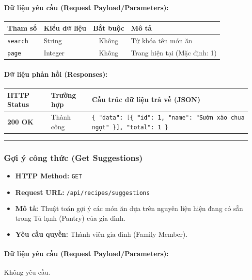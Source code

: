 \documentclass[12pt,a4paper]{article}
\begin{document}
\paragraph{Dữ liệu yêu cầu (Request Payload/Parameters):}
\begin{longtable}{|p{2.8cm}|p{2.2cm}|c|p{7.0cm}|}
\hline
\textbf{Tham số} & \textbf{Kiểu dữ liệu} & \textbf{Bắt buộc} & \textbf{Mô tả} \\ \hline
\endhead
\texttt{search} & String & Không & Từ khóa tên món ăn \\ \hline
\texttt{page} & Integer & Không & Trang hiện tại (Mặc định: 1) \\ \hline
\end{longtable}

\paragraph{Dữ liệu phản hồi (Responses):}
\begin{longtable}{|p{2.8cm}|p{3.2cm}|p{8.0cm}|}
\hline
\textbf{HTTP Status} & \textbf{Trường hợp} & \textbf{Cấu trúc dữ liệu trả về (JSON)} \\ \hline
\endhead
\textbf{200 OK} & Thành công & \texttt{\{ "data": [\{ "id": 1, "name": "Sườn xào chua ngọt" \}], "total": 1 \}} \\ \hline
\end{longtable}

\vskip 0.4cm
\noindent\rule{\textwidth}{0.3pt}
\vskip 0.4cm

\subsubsection{Gợi ý công thức (Get Suggestions)}
\begin{itemize}[leftmargin=*]
    \item \textbf{HTTP Method:} \texttt{GET}
    \item \textbf{Request URL:} \texttt{/api/recipes/suggestions}
    \item \textbf{Mô tả:} Thuật toán gợi ý các món ăn dựa trên nguyên liệu hiện đang có sẵn trong Tủ lạnh (Pantry) của gia đình.
    \item \textbf{Yêu cầu quyền:} Thành viên gia đình (Family Member).
\end{itemize}

\paragraph{Dữ liệu yêu cầu (Request Payload/Parameters):}
Không yêu cầu.\\
\end{document}
